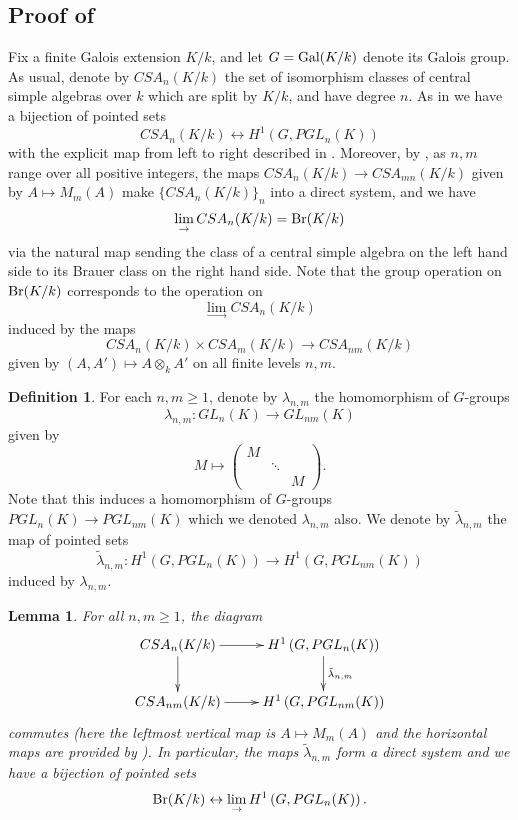 \documentclass[11pt]{amsart}
\numberwithin{equation}{section}
\newtheorem{lemma}[equation]{Lemma}
\theoremstyle{remark}
\theoremstyle{remark}
\theoremstyle{remark}
\theoremstyle{definition}
\theoremstyle{definition}
\theoremstyle{definition}
\newtheorem{defi}[equation]{Definition}
\theoremstyle{definition}
\theoremstyle{definition}
\theoremstyle{definition}
\begin{document}
\subsection{Proof of }

Fix a finite Galois extension $K/k$, and let $G=\textup{Gal}(K/k)$ denote its Galois group. As usual, denote by $CSA_n(K/k)$ the set of isomorphism classes of central simple algebras over $k$ which are split by $K/k$, and have degree $n$. As in   we have a bijection of pointed sets 
\[CSA_n(K/k) \leftrightarrow H^1\left(G,PGL_n(K)\right)\]
with the explicit map from left to right described in . Moreover, by , as $n,m$ range over all positive integers, the maps $CSA_n(K/k)\rightarrow CSA_{mn}(K/k)$ given by $A\mapsto M_m(A)$ make $\{CSA_n(K/k)\}_{n}$ into a direct system, and we have 
\[\lim_{\rightarrow}CSA_n(K/k)=\textup{Br}(K/k)\]
via the natural map sending the class of a central simple algebra on the left hand side to its Brauer class on the right hand side. Note that the group operation on $\textup{Br}(K/k)$ corresponds to the operation on \[\lim_{\rightarrow}CSA_n(K/k)\] induced by the maps
\[CSA_n(K/k)\times CSA_m(K/k)\rightarrow CSA_{nm}(K/k)\]
given by $(A,A')\mapsto A\otimes_k A'$ on all finite levels $n,m$. 

\begin{defi}
For each $n,m\geq 1$, denote by $\lambda_{n,m}$ the homomorphism of $G$-groups
\[\lambda_{n,m}:GL_n(K)\rightarrow GL_{nm}(K)\]
given by
\[M\mapsto \left(\begin{array}{ccc}M&&\\&\ddots&\\&&M\end{array}\right).\]
Note that this induces a homomorphism of $G$-groups $PGL_{n}(K)\rightarrow PGL_{nm}(K)$ which we denoted $\lambda_{n,m}$ also. We denote by $\tilde{\lambda}_{n,m}$ the map of pointed sets
\[\tilde{\lambda}_{n,m}:H^1\left(G,PGL_n(K)\right)\longrightarrow H^1\left(G,PGL_{nm}(K)\right)\]
induced by $\lambda_{n,m}$. 
\end{defi}

\begin{lemma} \label{brauer limit cohom}
For all $n,m\geq 1$, the diagram
\[\xymatrix{CSA_n(K/k)\ar[r]\ar[d]& H^1\left(G,PGL_n(K)\right)\ar[d]^{\tilde{\lambda}_{n,m}}\\ CSA_{nm}(K/k)\ar[r]& H^1\left(G,PGL_{nm}(K)\right)}\]
commutes (here the leftmost vertical map is $A\mapsto M_m(A)$ and the horizontal maps are provided by ). In particular, the maps $\tilde{\lambda}_{n,m}$ form a direct system and we have a bijection of pointed sets
\[\textup{Br}(K/k)\leftrightarrow \lim_{\rightarrow}H^1\left(G,PGL_n(K)\right).\]
\end{lemma}
\end{document}
